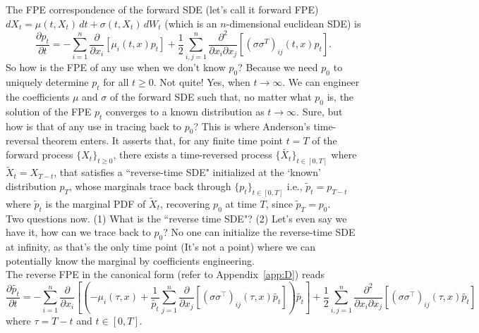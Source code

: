 \documentclass[11pt]{amsart}
\theoremstyle{plain}
\theoremstyle{definition}
\theoremstyle{remark}
\numberwithin{equation}{section}
\begin{document}
{The FPE correspondence of the forward SDE (let's call it forward FPE) $dX_t = \mu(t, X_t)\,dt + \sigma(t, X_t)\,dW_t$ (which is an $n$-dimensional euclidean SDE) is 
\begin{equation}
    \frac{\partial p_t}{\partial t} = -\sum_{i=1}^n \frac{\partial}{\partial x_i}[\mu_i(t, x)p_t] + \frac{1}{2}\sum_{i,j=1}^n \frac{\partial^2}{\partial x_i \partial x_j}[(\sigma\sigma^T)_{ij}(t, x)p_t].
    \label{eq:FPE}
\end{equation}
So how is the FPE of any use when we don't know $p_0$? Because we need $p_0$ to uniquely determine $p_t$ for all $t \geq 0$. Not quite! Yes, when $t \rightarrow \infty$. We can engineer the coefficients $\mu$ and $\sigma$ of the forward SDE such that, no matter what $p_0$ is, the solution of the FPE $p_t$ converges to a known distribution as $t \rightarrow \infty$. Sure, but how is that of any use in tracing back to $p_0$? 
This is where Anderson's time-reversal theorem \cite{anderson1982} 
enters. It asserts that, for any finite time point $t=T$ of the forward process $\{{X_t}\}_{t \geq 0}$, there exists a time-reversed process $\{\tilde{X_t}\}_{t \in [0,T]}$ where
$\tilde{X}_t = X_{T-t}$, that satisfies a ``reverse-time SDE" initialized at the 
`known' distribution $p_T$, whose marginals trace back through 
$\{p_t\}_{t \in [0,T]}$ i.e., $\tilde{p}_t=p_{T-t}$ where $\tilde{p}_t$ is the marginal PDF of $\tilde{X}_t$, recovering $p_0$ at time $T$, since $\tilde{p}_T=p_0$.\\

Two questions now. (1) What is the ``reverse time SDE"? (2) Let's even say we have it, how can we trace back to $p_0$? No one can initialize the reverse-time SDE at infinity, as that's the only time point (It's not a point) where we can potentially know the marginal by coefficients engineering.\\

The reverse FPE in the canonical form (refer to Appendix~\ref{app:D}) reads
\begin{equation}
    \frac{\partial \tilde{p_{t}}}{\partial t} = -\sum_{i=1}^n \frac{\partial}{\partial x_i}
\left[\left(-\mu_i(\tau, x) +\frac{1}{\tilde{p_{t}}}\sum_{j=1}^n \frac{\partial}{\partial x_j}
[(\sigma\sigma^\top)_{ij}(\tau, x)\tilde{p_{t}}]\right)\tilde{p_{t}}\right]
+ \frac{1}{2}\sum_{i,j=1}^n \frac{\partial^2}{\partial x_i \partial x_j}
[(\sigma\sigma^\top)_{ij}(\tau, x) \tilde{p_{t}}]
    \label{eq:reverse-FPE}
\end{equation}
where $\tau=T-t$ and $t \in [0,T]$.\\

}
\end{document}
